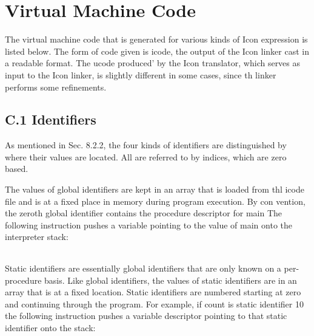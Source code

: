 \chapter{Virtual Machine Code}

The virtual machine code that is generated for various kinds of Icon
expression is listed below. The form of code given is icode, the
output of the Icon linker cast in a readable format. The ucode
produced' by the Icon translator, which serves as input to the Icon
linker, is slightly different in some cases, since th linker performs
some refinements.


\section{C.1 Identifiers}

As mentioned in Sec. 8.2.2, the four kinds of identifiers are
distinguished by where their values are located. All are referred to
by indices, which are zero based.


The values of global identifiers are kept in an array that is loaded
from thl icode file and is at a fixed place in memory during program
execution. By con vention, the zeroth global identifier contains the
procedure descriptor for main The following instruction pushes a
variable pointing to the value of main onto the interpreter stack:

\begin{flushleft}
\tabletail{}
\tablelasttail{}
\begin{supertabular}{|m{1.9066598in}|m{2.75596in}|}

\end{supertabular}
\end{flushleft}

Static identifiers are essentially global identifiers that are only
known on a per-procedure basis. Like global identifiers, the values of
static identifiers are in an array that is at a fixed location. Static
identifiers are numbered starting at zero and continuing through the
program. For example, if count is static identifier 10 the following
instruction pushes a variable descriptor pointing to that static
identifier onto the stack:

\begin{flushleft}
\tabletail{}
\tablelasttail{}
\begin{supertabular}{|m{1.9066598in}|m{2.75596in}|}

\end{supertabular}
\end{flushleft}

